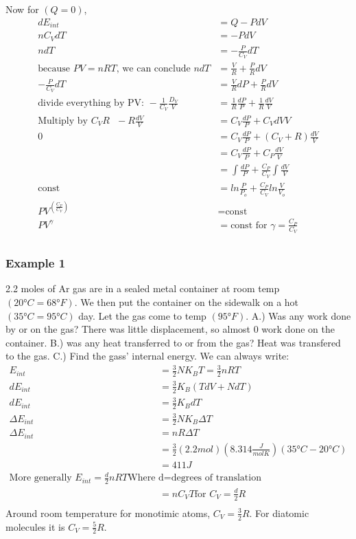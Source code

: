 	Now for $(Q=0)$,
	\begin{align*}
	dE_{int}&=Q-PdV\\
	nC_VdT&=-PdV\\
	ndT&=-\frac{P}{C_V}dT\\
	\text{because }PV=nRT \text{, we can conclude } ndT&=\frac{V}{R}+\frac{P}{R}dV\\
	-\frac{P}{C_V}dT&=\frac{V}{R}dP+\frac{P}{R}dV\\
	\text{divide everything by PV: } -\frac{1}{C_V}\frac{D_V}{V} &=\frac{1}{R}\frac{dP}{P}+\frac{1}{R}\frac{dV}{V}\\
	\text{Multiply by }C_VR \text{ } -R\frac{dV}{V}&=C_V\frac{dP}{P}+C_V{dV}{V}\\
	0&=C_V\frac{dP}{P}+(C_V+R)\frac{dV}{V}\\
	&=C_V\frac{dP}{P}+C_P\frac{dV}{V}\\
	&=\int{\frac{dP}{P}}+\frac{C_P}{C_V}\int{\frac{dV}{V}}\\
	\text{const}&=ln\frac{P}{P_o}+\frac{C_P}{C_V}ln\frac{V}{V_o}\\
	PV^{\left(\frac{C_P}{C_V}\right)}&=\text{const}\\
	PV^{\gamma}&=\text{const for } \gamma=\frac{C_P}{C_V}\\
	\end{align*}
	\subsubsection{Example 1}
	2.2 moles of Ar gas are in a sealed metal container at room temp $(20\si{\degree}C=68\si{\degree}F)$. We then put the container on the sidewalk on a hot $(35\si{\degree}C=95\si{\degree}C)$ day. Let the gas come to temp $(95\si{\degree}F)$.
	\newline
	A.) Was any work done by or on the gas? There was little displacement, so almost 0 work done on the container.
	\newline
	B.) was any heat transferred to or from the gas? Heat was transfered to the gas.
	\newline
	C.) Find the gass' internal energy. We can always write:
	\newline
	\begin{align*}
	E_{int}&=\frac{3}{2}NK_BT=\frac{3}{2}nRT\\
	dE_{int}&=\frac{3}{2}K_B(TdV+NdT)\\
	dE_{int}&=\frac{3}{2}K_BdT\\
	\Delta E_{int}&=\frac{3}{2}NK_B\Delta T\\
	\Delta E_{int}&=nR\Delta T\\
	&=\frac{3}{2}(2.2mol)(8.314\frac{J}{molK})(35\si{\degree}C-20\si{\degree}C)\\
	&=411J\\
	\text{More generally } E_{int}=\frac{d}{2}nRT \text{Where d=degrees of translation}\\
	&=nC_VT \text{for } C_V=\frac{d}{2}R\\
	\end{align*}
	\newline
	Around room temperature for monotimic atoms, $C_V=\frac{3}{2}R$. For diatomic molecules it is $C_V=\frac{5}{2}R$.
